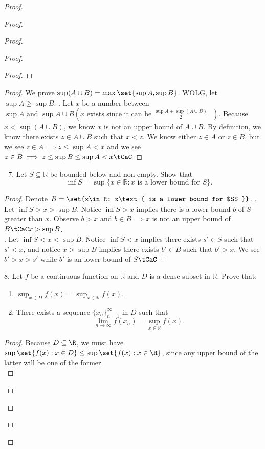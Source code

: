 \documentclass{report}
\begin{document}
\begin{proof}
\begin{proof}
\begin{proof}
\begin{proof}
\begin{proof}
\end{proof}
\begin{proof}
We prove $\sup (A\cup B)=\max \set{\sup A,\sup B}$. WOLG, let $\sup A\geq \sup B$. . Let $x$ be a number between  $\sup A\text{ and }\sup A\cup B(x\text{ exists since it can be $\frac{\sup A+\sup (A\cup B)}{2}$ })$. Because $x<\sup (A\cup B)$, we know $x$ is not an upper bound of  $A\cup B$. By definition, we know there exists $z\in A\cup B$ such that $x<z$. We know either $z \in A$ or $z \in B$, but we see $z \in A\implies z\leq \sup A<x$ and we see $z \in B\implies z\leq \sup B\leq \sup A<x\tCaC$
\end{proof}
\begin{question}{}{}
\begin{enumerate}
    \setcounter{enumi}{6}
    \item Let \( S \subseteq \mathbb{R} \) be bounded below and non-empty. Show that
    \[ \inf S = \sup\{ x \in \mathbb{R} : x \text{ is a lower bound for } S \}. \]
\end{enumerate}
\end{question}
\begin{proof}
Denote $B=\set{x\in R: x\text{ is a lower bound for $S$ }}$. . Let $\inf S>x>\sup B$. Notice $\inf S>x$ implies there is a lower bound  $b$ of  $S$ greater than  $x$. Observe $b>x\text{ and }b \in B\implies x$ is not an upper bound of $B\tCaC x>\sup B$.\\

. Let $\inf S<x<\sup B$. Notice $\inf S<x$ implies there exists $s' \in S$ such that $s'<x$, and notice $x> \sup B$ implies there exists $b'\in B$ such that $b'>x$. We see  $b'>x>s'$ while  $b'$ is an lower bound of  $S\tCaC$
\end{proof}
\begin{question}{}{}
8. Let \( f \) be a continuous function on \( \mathbb{R} \) and \( D \) is a dense subset in \( \mathbb{R} \). Prove that:
\begin{enumerate}
    \item \( \sup_{x \in D} f(x) = \sup_{x \in \mathbb{R}} f(x) \).
    \item There exists a sequence \( \{x_n\}_{n=1}^{\infty} \) in \( D \) such that 
    \[
    \lim_{n \to \infty} f(x_n) = \sup_{x \in \mathbb{R}} f(x).
    \]
\end{enumerate}
\end{question}
\begin{proof}
Because $D\subseteq \R$, we must have $\sup \set{f(x): x\in D}\leq \sup \set{f(x): x\in \R}$, since any upper bound of the latter will be one of the former.\\


\end{proof}
\end{proof}
\end{proof}
\end{proof}
\end{proof}
\end{document}
